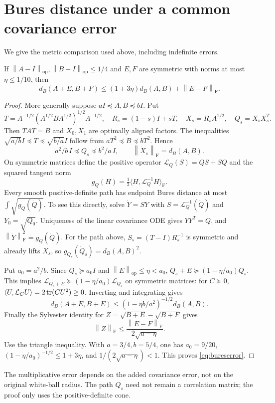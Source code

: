 \documentclass[11pt]{article}
\newcommand{\op}{\mathrm{op}}\newcommand{\F}{\mathrm F}
\newcommand{\norm}[1]{\left\lVert#1\right\rVert}
\begin{document}
\section{Bures distance under a common covariance error}\label{app:bures}
We give the metric comparison used above, including indefinite errors.
\begin{lemma}\label{lem:bureserror}
If $\norm{A-I}_\op,\norm{B-I}_\op\le1/4$ and $E,F$ are symmetric with norms at most $\eta\le1/10$, then
\begin{equation}\label{eq:bureserror}
 d_B(A+E,B+F)\le(1+3\eta)d_B(A,B)+\norm{E-F}_\F.
\end{equation}
\end{lemma}
\begin{proof}
More generally suppose $aI\preceq A,B\preceq bI$. Put
\[
 T=A^{-1/2}(A^{1/2}BA^{1/2})^{1/2}A^{-1/2},\quad
 R_s=(1-s)I+sT,\quad X_s=R_sA^{1/2},\quad Q_s=X_sX_s^T.
\]
Then $TAT=B$ and $X_0,X_1$ are optimally aligned factors. The inequalities $\sqrt{a/b}I\preceq T\preceq\sqrt{b/a}I$ follow from $aT^2\preceq B\preceq bT^2$. Hence
\begin{equation}\label{eq:pathbounds}
 a^2/b\,I\preceq Q_s\preceq b^2/a\,I,\qquad
 \norm{\dot X_s}_\F=d_B(A,B).
\end{equation}
On symmetric matrices define the positive operator $\mathcal L_Q(S)=QS+SQ$ and the squared tangent norm
\[
 g_Q(H)=\tfrac12\langle H,\mathcal L_Q^{-1}H\rangle_\F.
\]
Every smooth positive-definite path has endpoint Bures distance at most $\int\sqrt{g_Q(\dot Q)}$. To see this directly, solve $\dot Y=SY$ with $S=\mathcal L_Q^{-1}(\dot Q)$ and $Y_0=\sqrt{Q_0}$. Uniqueness of the linear covariance ODE gives $YY^T=Q$, and $\norm{\dot Y}_\F^2=g_Q(\dot Q)$. For the path above, $S_s=(T-I)R_s^{-1}$ is symmetric and already lifts $X_s$, so $g_{Q_s}(\dot Q_s)=d_B(A,B)^2$.

Put $a_0=a^2/b$. Since $Q_s\succeq a_0I$ and $\norm E_\op\le\eta<a_0$, $Q_s+E\succeq(1-\eta/a_0)Q_s$. This implies $\mathcal L_{Q_s+E}\succeq(1-\eta/a_0)\mathcal L_{Q_s}$ on symmetric matrices: for $C\succeq0$, $\langle U,\mathcal L_C U\rangle=2\operatorname{tr}(CU^2)\ge0$. Inverting and integrating gives
\[
 d_B(A+E,B+E)\le(1-\eta b/a^2)^{-1/2}d_B(A,B).
\]
Finally the Sylvester identity for $Z=\sqrt{B+E}-\sqrt{B+F}$ gives
\[
 \norm Z_\F\le\frac{\norm{E-F}_\F}{2\sqrt{a-\eta}}.
\]
Use the triangle inequality. With $a=3/4,b=5/4$, one has $a_0=9/20$, $(1-\eta/a_0)^{-1/2}\le1+3\eta$, and $1/(2\sqrt{a-\eta})<1$. This proves \eqref{eq:bureserror}.
\end{proof}
The multiplicative error depends on the added covariance error, not on the original white-ball radius. The path $Q_s$ need not remain a correlation matrix; the proof only uses the positive-definite cone.
\end{document}
